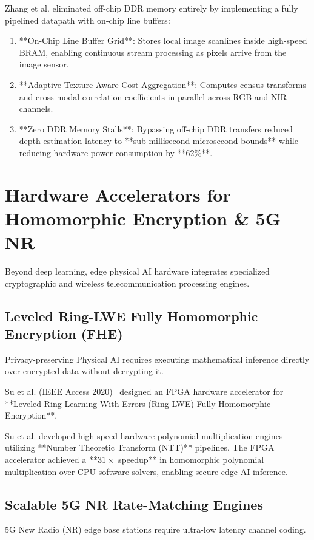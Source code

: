 \begin{hardwarebox}
Zhang et al. eliminated off-chip DDR memory entirely by implementing a fully pipelined datapath with on-chip line buffers:
\begin{enumerate}[leftmargin=*]
    \item **On-Chip Line Buffer Grid**: Stores local image scanlines inside high-speed BRAM, enabling continuous stream processing as pixels arrive from the image sensor.
    \item **Adaptive Texture-Aware Cost Aggregation**: Computes census transforms and cross-modal correlation coefficients in parallel across RGB and NIR channels.
    \item **Zero DDR Memory Stalls**: Bypassing off-chip DDR transfers reduced depth estimation latency to **sub-millisecond microsecond bounds** while reducing hardware power consumption by **$62\%$**.
\end{enumerate}
\end{hardwarebox}

\section{Hardware Accelerators for Homomorphic Encryption \& 5G NR}
Beyond deep learning, edge physical AI hardware integrates specialized cryptographic and wireless telecommunication processing engines.

\subsection{Leveled Ring-LWE Fully Homomorphic Encryption (FHE)}
Privacy-preserving Physical AI requires executing mathematical inference directly over encrypted data without decrypting it. 

Su et al. (IEEE Access 2020)~\cite{su2020fpga} designed an FPGA hardware accelerator for **Leveled Ring-Learning With Errors (Ring-LWE) Fully Homomorphic Encryption**. 

Su et al. developed high-speed hardware polynomial multiplication engines utilizing **Number Theoretic Transform (NTT)** pipelines. The FPGA accelerator achieved a **$31\times$ speedup** in homomorphic polynomial multiplication over CPU software solvers, enabling secure edge AI inference.

\subsection{Scalable 5G NR Rate-Matching Engines}
5G New Radio (NR) edge base stations require ultra-low latency channel coding. 

